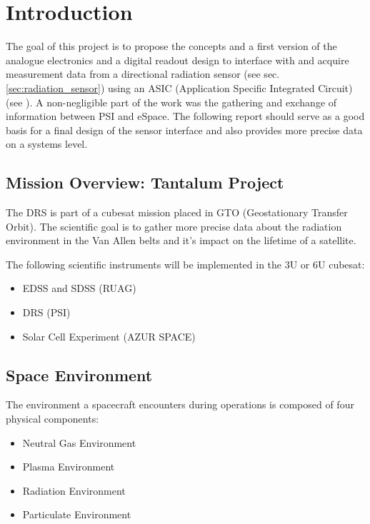 \section{Introduction}
\label{sec:introduction}

The goal of this project is to propose the concepts and a first version of the analogue electronics and a digital readout design to interface with and acquire measurement data from a directional radiation sensor (see sec. \ref{sec:radiation_sensor}) using an ASIC (Application Specific Integrated Circuit) (see \cite{Meier2016VATA466}).
A non-negligible part of the work was the gathering and exchange of information between PSI and eSpace.
The following report should serve as a good basis for a final design of the sensor interface and also provides more precise data on a systems level.

\subsection{Mission Overview: Tantalum Project}
\label{sec:mission_overview}
The DRS is part of a cubesat mission placed in GTO (Geostationary Transfer Orbit).
The scientific goal is to gather more precise data about the radiation environment in the Van Allen belts and it's impact on the lifetime of a satellite.

The following scientific instruments will be implemented in the 3U or 6U cubesat:\cite{tantalumproject2016}
\begin{itemize}
	\item EDSS and SDSS (RUAG)
	\item DRS (PSI)
	\item Solar Cell Experiment (AZUR SPACE)
\end{itemize}

\subsection{Space Environment}
\label{sec:space_environment}
The environment a spacecraft encounters during operations is composed of four physical components:\cite{hastings2004spacecraft}
\begin{itemize}
	\item Neutral Gas Environment
	\item Plasma Environment
	\item Radiation Environment
	\item Particulate Environment
\end{itemize}

